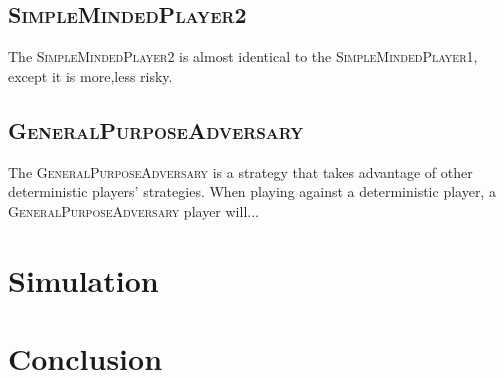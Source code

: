 \documentclass[conference]{IEEEtran}
\newcommand\SMPo{\textsc{SimpleMindedPlayer1}}
\newcommand\SMPt{\textsc{SimpleMindedPlayer2}}
\newcommand\GPA{\textsc{GeneralPurposeAdversary}}
\begin{document}
\subsection{\SMPt}
The \SMPt{} is almost identical to the \SMPo, except it is {more,less} risky.

\subsection{\GPA}
The \GPA{} is a strategy that takes advantage of other deterministic players'
strategies. When playing against a deterministic player, a \GPA{} player
will...

\section{Simulation}

\section{Conclusion}
\end{document}
